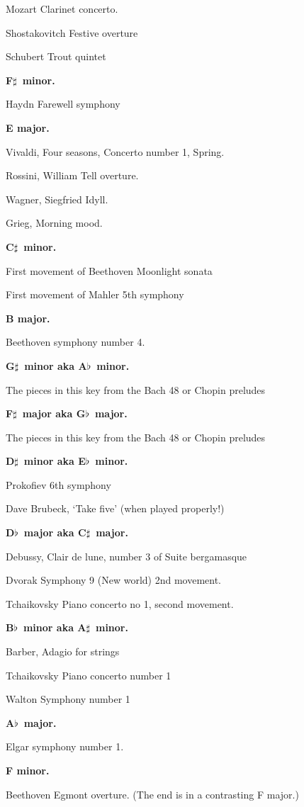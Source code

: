 \documentclass[a4paper]{article}
\newcommand\fl{$\flat$}
\newcommand\sh{$\sharp$}
\begin{document}
Mozart Clarinet concerto.

Shostakovitch Festive overture

Schubert Trout quintet

\noindent\textbf{F\sh\ minor.}

Haydn Farewell symphony

\noindent\textbf{E major.}

Vivaldi, Four seasons, Concerto number 1, Spring.

Rossini, William Tell overture.

Wagner, Siegfried Idyll.

Grieg, Morning mood.

\noindent\textbf{C\sh\ minor.}

First movement of Beethoven Moonlight sonata

First movement of Mahler 5th symphony

\noindent\textbf{B major.}

Beethoven symphony number 4.

\noindent\textbf{G\sh\ minor aka A\fl\ minor.}

The pieces in this key from the Bach 48 or Chopin preludes

\noindent\textbf{F\sh\  major aka G\fl\ major.}

The pieces in this key from the Bach 48 or Chopin preludes

\noindent\textbf{D\sh\ minor aka E\fl\ minor.}

Prokofiev 6th symphony

Dave Brubeck, `Take five' (when played properly!)

\noindent\textbf{D\fl\ major aka C\sh\ major.}

Debussy, Clair de lune, number 3 of Suite bergamasque

Dvorak Symphony 9 (New world) 2nd movement.

Tchaikovsky Piano concerto no 1, second movement.

\noindent\textbf{B\fl\ minor aka A\sh\ minor.}

Barber, Adagio for strings

Tchaikovsky Piano concerto number 1

Walton Symphony number 1

\noindent\textbf{A\fl\ major.}

Elgar symphony number 1.

\noindent\textbf{F minor.}

Beethoven Egmont overture.  (The end is in a contrasting F major.)
\end{document}
